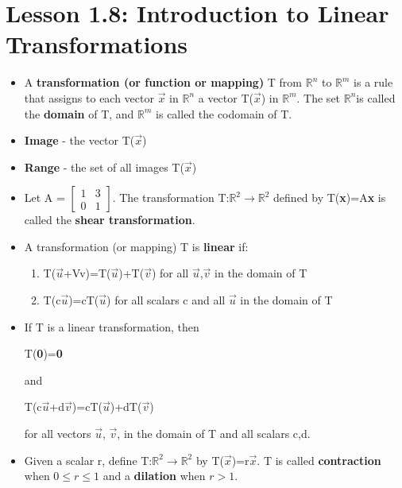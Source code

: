 \documentclass{report}
\newcommand{\Vu}{$\vec{u}$}
\newcommand{\Vv}{$\vec{v}$}
\newcommand{\Vx}{$\vec{x}$}
\newcommand{\Rn}{$\mathbb{R}^n$}
\newcommand{\Rm}{$\mathbb{R}^m$}
\newcommand{\Rtwo}{$\mathbb{R}^2$}
\begin{document}
\section{Lesson 1.8: Introduction to Linear Transformations}
	\begin{itemize}\addtolength{\leftskip}{2em}
		\item A \textbf{transformation (or function or mapping)} T from {\Rn} to {\Rm} is a rule that assigns to each vector {\Vx} in {\Rn} a vector T({\Vx}) in {\Rm}. The set \Rn is called the \textbf{domain} of T, and {\Rm} is called the codomain of T.
		\item \textbf{Image} - the vector T({\Vx})
		\item \textbf{Range} - the set of all images T({\Vx})
		\item Let A = $\begin{bmatrix}
		1 & 3\\
		0 & 1\end{bmatrix}$. The transformation T:{\Rtwo}$\rightarrow${\Rtwo} defined by T(\textbf{x})=A\textbf{x} is called the \textbf{shear transformation}. 
		\item A transformation (or mapping) T is \textbf{linear} if:
			\begin{enumerate}\addtolength{\leftskip}{4em}
			\item T(\Vu+Vv)=T(\Vu)+T(\Vv) for all {\Vu},{\Vv} in the domain of T
			\item T(c\Vu)=cT(\Vu) for all scalars c and all {\Vu} in the domain of T
			\end{enumerate}
		\item If T is a linear transformation, then
		\begin{center}T(\textbf{0})=\textbf{0}\end{center}
		\begin{center}
		and
		\end{center}
		\begin{center}
		T(c\Vu+d\Vv)=cT(\Vu)+dT(\Vv)
		\end{center}
		for all vectors {\Vu}, {\Vv}, in the domain of T and all scalars c,d.
		\item Given a scalar r, define T:\Rtwo$\rightarrow${\Rtwo} by T(\Vx)=r{\Vx}. T is called \textbf{contraction} when $0\leq r\leq 1$ and a \textbf{dilation} when $r>1$.
		
	\end{itemize}
	\newpage
\end{document}
